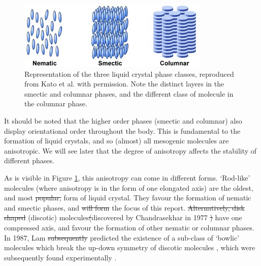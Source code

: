\documentclass[11pt, a4paper]{article} %
\providecommand{\DIFadd}[1]{{\protect\color{blue}\uwave{#1}}} %
\providecommand{\DIFdel}[1]{{\protect\color{red}\sout{#1}}}                      %
\providecommand{\DIFaddbegin}{} %
\providecommand{\DIFaddend}{} %
\providecommand{\DIFdelbegin}{} %
\providecommand{\DIFdelend}{} %
\begin{document}
\begin{figure} [h!]
	\centering
	\includegraphics[width=0.7\linewidth]{Figures/lc_phases_cropped}
	\caption{Representation of the three liquid crystal phase classes, reproduced from Kato et al. \cite{Kato2007} with permission. Note the distinct layers in the smectic and columnar phases, and the different class of molecule in the columnar phase.}
	\label{fig:lcphasescropped}
\end{figure}


It should be noted that the higher order phases (smectic and columnar) also display orientational order throughout the body. This is fundamental to the formation of liquid crystals, and so (almost) all mesogenic molecules are anisotropic. We will see later that the degree of anisotropy affects the stability of different phases. 

As is visible in Figure \ref{fig:lcphasescropped}, this anisotropy can come in different forms. `Rod-like' molecules (where anisotropy is in the form of one elongated axis) are the oldest, and most \DIFdelbegin \DIFdel{popular, }\DIFdelend \DIFaddbegin \DIFadd{\textcolor{forestgreen}{common} }\DIFaddend form of liquid crystal. They favour the formation of nematic and smectic phases, and \DIFdelbegin \DIFdel{will form }\DIFdelend \DIFaddbegin \DIFadd{\textcolor{forestgreen}{are} }\DIFaddend the focus of this report. \DIFdelbegin \DIFdel{Alternatively, disk shaped }\DIFdelend \DIFaddbegin \DIFadd{Disk-shaped }\DIFaddend (discotic) molecules\DIFdelbegin \DIFdel{(}\DIFdelend \DIFaddbegin \DIFadd{, }\DIFaddend discovered by Chandrasekhar in 1977 \cite{Chandrasekhar1977}\DIFdelbegin \DIFdel{) }\DIFdelend \DIFaddbegin \DIFadd{, }\DIFaddend have one compressed axis, and favour the formation of other nematic or columnar phases. In 1987, Lam \DIFdelbegin \DIFdel{subsequently }\DIFdelend predicted the existence of a sub-class of `bowlic' molecules which break the up-down symmetry of discotic molecules \cite{LinLei1988}, which were subsequently found experimentally \cite{Zimmermann1985, Malthete1985}.
\end{document}
